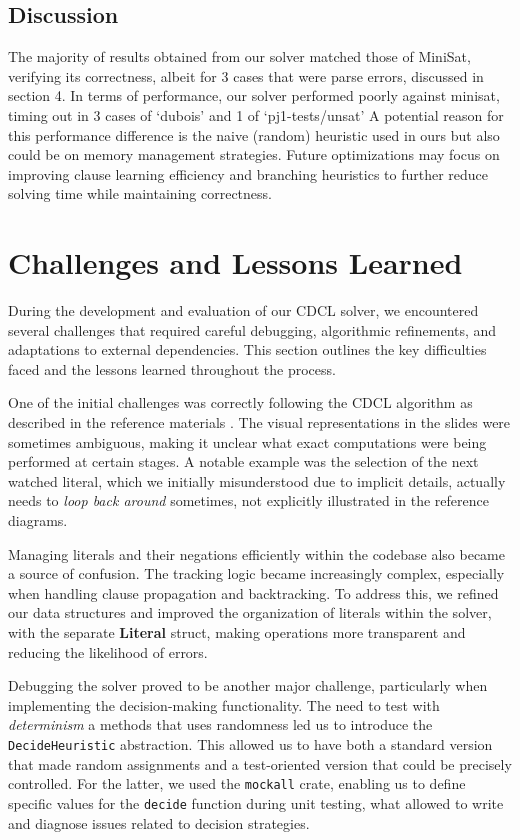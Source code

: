 \documentclass[a4paper,12pt]{article}
\begin{document}
\subsection{Discussion}
The majority of results obtained from our solver matched those of MiniSat, verifying its correctness,
albeit for 3 cases that were parse errors, discussed in section 4.  In terms of performance, our
solver performed poorly against minisat, timing out in 3 cases of `dubois' and 1 of `pj1-tests/unsat'
A potential reason for this performance difference is the naive (random) heuristic used in ours
but also could be on memory management strategies.
Future optimizations may focus on improving clause learning efficiency and branching heuristics to
further reduce solving time while maintaining correctness.

\section{Challenges and Lessons Learned}
\label{sec:challenges}

During the development and evaluation of our CDCL solver, we encountered several challenges that
required careful debugging, algorithmic refinements, and adaptations to external dependencies.
This section outlines the key difficulties faced and the lessons learned throughout the process.

One of the initial challenges was correctly following the CDCL algorithm as described in the
reference materials \cite{CdclAlgorithm}. The visual representations in the slides were
sometimes ambiguous, making it unclear what exact computations were being performed at certain
stages. A notable example was the selection of the next watched literal, which we initially
misunderstood due to implicit details, actually needs to \textit{loop back around} sometimes,
not explicitly illustrated in the reference diagrams.

Managing literals and their negations efficiently within the codebase also became a source of
confusion. The tracking logic became increasingly complex, especially when handling clause
propagation and backtracking. To address this, we refined our data structures and improved
the organization of literals within the solver, with the separate \textbf{Literal} struct,
making operations more transparent and reducing the likelihood of errors.

Debugging the solver proved to be another major challenge, particularly when implementing the
decision-making functionality. The need to test with \textit{determinism} a methods that uses
randomness led us to introduce the \texttt{DecideHeuristic} abstraction. This allowed us to
have both a standard version that made random assignments and a test-oriented version that could
be precisely controlled. For the latter, we used the \texttt{mockall} crate, enabling us to
define specific values for the \texttt{decide} function during unit testing, what allowed to
write and diagnose issues related to decision strategies.
\end{document}
